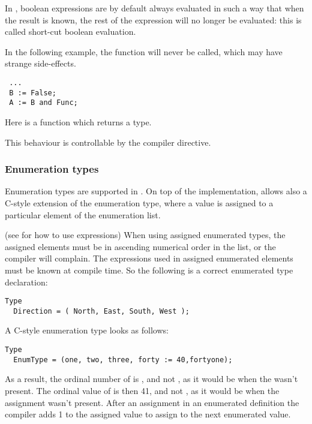 \begin{remark}
In \fpc, boolean expressions are by default always evaluated in such a
way that when the result is known, the rest of the expression will no longer
be evaluated: this is called short-cut boolean evaluation. 

In the following example, the function  will never be called, 
which may have strange side-effects.
\begin{verbatim}
 ...
 B := False;
 A := B and Func;
\end{verbatim}
Here  is a function which returns a  type.

This behaviour is controllable by the  compiler directive.
\end{remark}

\subsubsection{Enumeration types}
Enumeration types are supported in \fpc. On top of the \tp
implementation, \fpc allows also a C-style extension of the
enumeration type, where a value is assigned to a particular element of
the enumeration list.

(see  for how to use expressions)
When using assigned enumerated types, the assigned elements must be in
ascending numerical order in the list, or the compiler will complain.
The expressions used in assigned enumerated elements must be known at
compile time.
So the following is a correct enumerated type declaration:
\begin{verbatim}
Type
  Direction = ( North, East, South, West );
\end{verbatim}
A C-style enumeration type looks as follows:
\begin{verbatim}
Type
  EnumType = (one, two, three, forty := 40,fortyone);
\end{verbatim}
As a result, the ordinal number of  is , and not ,
as it would be when the  wasn't present.
The ordinal value of  is then {41}, and not , as it
would be when the assignment wasn't present. After an assignment in an
enumerated definition the compiler adds 1 to the assigned value to assign to
the next enumerated value.

